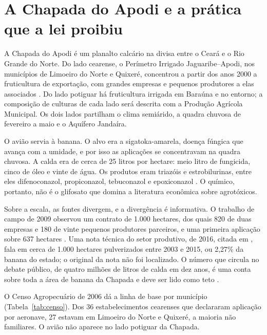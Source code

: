 \section{A Chapada do Apodi e a prática que a lei proibiu}

A Chapada do Apodi é um planalto calcário na divisa entre o Ceará e o Rio
Grande do Norte. Do lado cearense, o Perímetro Irrigado Jaguaribe--Apodi, nos
municípios de Limoeiro do Norte e Quixeré, concentrou a partir dos anos 2000 a
fruticultura de exportação, com grandes empresas e pequenos produtores a elas
associados \cite{marinho2011dimensao, aguiar2017}. Do lado potiguar há
fruticultura irrigada em Baraúna e no entorno; a composição de culturas de cada
lado será descrita com a Produção Agrícola Municipal. Os dois lados partilham o clima
semiárido, a quadra chuvosa de fevereiro a maio e o Aquífero Jandaíra.

O avião servia à banana. O alvo era a sigatoka-amarela, doença fúngica que
avança com a umidade, e por isso as aplicações se concentravam na quadra
chuvosa. A calda era de cerca de 25 litros por hectare: meio litro de
fungicida, cinco de óleo e vinte de água. Os produtos eram triazóis e
estrobilurinas, entre eles difenoconazol, propiconazol, tebuconazol e
epoxiconazol \cite[p.~526]{teixeira2011rebulico}. O químico, portanto, não é o
glifosato que domina a literatura econômica sobre agrotóxicos.

Sobre a escala, as fontes divergem, e a divergência é informativa. O trabalho de
campo de 2009 observou um contrato de 1.000 hectares, dos quais 820 de duas
empresas e 180 de vinte pequenos produtores parceiros, e uma primeira aplicação
sobre 637 hectares \cite[p.~171--173]{marinho2011dimensao}. Uma nota técnica do
setor produtivo, de 2016, citada em , fala em cerca de
1.000 hectares pulverizados entre 2003 e 2015, ou 2,27\% da banana do estado; o
original da nota não foi localizado. O número
que circula no debate público, de quatro milhões de litros de calda em dez
anos, é uma conta sobre toda a área de banana da Chapada e deve ser lido como
teto \cite[p.~527]{teixeira2011rebulico}.

O Censo Agropecuário de 2006 dá a linha de base por município
(Tabela~\ref{tab:censo}). Dos 36 estabelecimentos cearenses que declararam
aplicação por aeronave, 27 estavam em Limoeiro do Norte e Quixeré, a maioria não
familiares. O avião não aparece no lado potiguar da Chapada.

